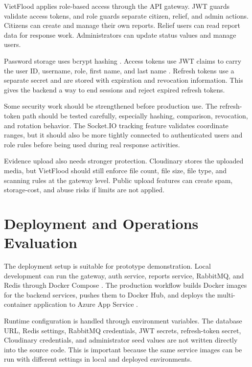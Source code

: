 VietFlood applies role-based access through the API gateway. JWT guards validate access tokens, and role guards separate citizen, relief, and admin actions. Citizens can create and manage their own reports. Relief users can read report data for response work. Administrators can update status values and manage users.

Password storage uses bcrypt hashing \cite{provos1999bcrypt}. Access tokens use JWT claims to carry the user ID, username, role, first name, and last name \cite{jones2015jwt}. Refresh tokens use a separate secret and are stored with expiration and revocation information. This gives the backend a way to end sessions and reject expired refresh tokens.

Some security work should be strengthened before production use. The refresh-token path should be tested carefully, especially hashing, comparison, revocation, and rotation behavior. The Socket.IO tracking feature validates coordinate ranges, but it should also be more tightly connected to authenticated users and role rules before being used during real response activities.

Evidence upload also needs stronger protection. Cloudinary stores the uploaded media, but VietFlood should still enforce file count, file size, file type, and scanning rules at the gateway level. Public upload features can create spam, storage-cost, and abuse risks if limits are not applied.

\section{Deployment and Operations Evaluation}

The deployment setup is suitable for prototype demonstration. Local development can run the gateway, auth service, reports service, RabbitMQ, and Redis through Docker Compose \cite{dockerComposeDocs}. The production workflow builds Docker images for the backend services, pushes them to Docker Hub, and deploys the multi-container application to Azure App Service \cite{githubActionsDocs,azureAppServiceContainersDocs}.

Runtime configuration is handled through environment variables. The database URL, Redis settings, RabbitMQ credentials, JWT secrets, refresh-token secret, Cloudinary credentials, and administrator seed values are not written directly into the source code. This is important because the same service images can be run with different settings in local and deployed environments.


